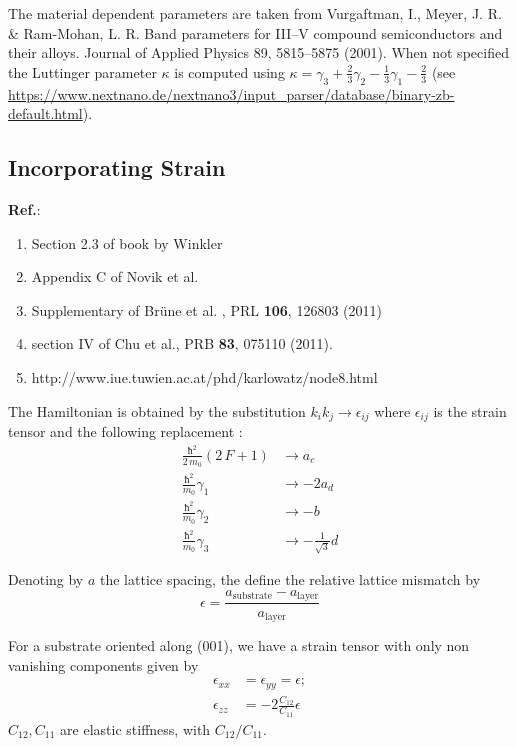 \documentclass[prb,aps]{revtex4}
\begin{document}
		
		The material dependent parameters are taken from Vurgaftman, I., Meyer, J. R. \& Ram-Mohan, L. R. Band parameters for III–V compound semiconductors and their alloys. Journal of Applied Physics 89, 5815–5875 (2001). When not specified the Luttinger parameter $κ$ is computed using $κ = γ_3 + \frac{2}{3} γ_2 - \frac{1}{3} γ_1 - \frac{2}{3}$ (see \url{https://www.nextnano.de/nextnano3/input_parser/database/binary-zb-default.html}).



	\subsection{Incorporating Strain}

		{\bf Ref.}:
		\begin{enumerate}
			\item Section 2.3 of book by Winkler
			\item Appendix C of Novik et al.
			\item Supplementary of Brüne et al. , PRL {\bf 106}, 126803 (2011)
			\item section IV of Chu et al., PRB {\bf 83}, 075110 (2011).
			\item http://www.iue.tuwien.ac.at/phd/karlowatz/node8.html
		\end{enumerate}

		The Hamiltonian is obtained by the substitution $k_i k_j  \to ϵ_{ij} $ where $ϵ_{ij}$ is the strain tensor and the following replacement :
		\begin{align}
			\frac{ħ^2}{2\,m_0} (2\,F+1) &\to a_c\\
			\frac{ħ^2}{ m_0} γ_1&\to - 2 a_d\\
			\frac{ħ^2}{ m_0} γ_2 &\to -  b\\
			\frac{ħ^2}{ m_0} γ_3&\to - \frac{1}{\sqrt{3}} d
		\end{align}

		Denoting by $a$ the lattice spacing, the define the relative lattice mismatch by
		\begin{equation}
		ϵ = \frac{ a_{\textrm{substrate}} - a_{\textrm{layer}} } {a_{\textrm{layer}}}
		\end{equation}

        For a substrate oriented along (001), we have a strain tensor with only non vanishing components given by
		\begin{align}
			ϵ_{xx} &= ϵ_{yy} = ϵ  ;\\
			ϵ_{zz} &= -2 \frac{C_{12}}{C_{11}} ϵ
		\end{align}
		$C_{12},C_{11}$ are elastic stiffness, with $C_{12}/C_{11}$.
\end{document}
